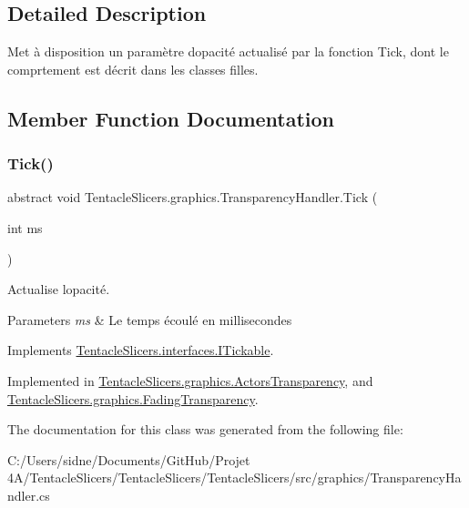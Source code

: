 \subsection{Detailed Description}
Met à disposition un paramètre d\textquotesingle{}opacité actualisé par la fonction Tick, dont le comprtement est décrit dans les classes filles. 



\subsection{Member Function Documentation}
\mbox{\label{class_tentacle_slicers_1_1graphics_1_1_transparency_handler_ab0f18e90768c180b0f804e1531a7c210}} 
\subsubsection{\texorpdfstring{Tick()}{Tick()}}
{\footnotesize\ttfamily abstract void Tentacle\+Slicers.\+graphics.\+Transparency\+Handler.\+Tick (\begin{DoxyParamCaption}\item[{int}]{ms }\end{DoxyParamCaption})\hspace{0.3cm}{\ttfamily [pure virtual]}}



Actualise l\textquotesingle{}opacité. 


\begin{DoxyParams}{Parameters}
{\em ms} & Le temps écoulé en millisecondes \\
\hline
\end{DoxyParams}


Implements \hyperlink{interface_tentacle_slicers_1_1interfaces_1_1_i_tickable}{Tentacle\+Slicers.\+interfaces.\+I\+Tickable}.



Implemented in \hyperlink{class_tentacle_slicers_1_1graphics_1_1_actors_transparency_ab8b40757e45cc24f5ac97a356cc9701b}{Tentacle\+Slicers.\+graphics.\+Actors\+Transparency}, and \hyperlink{class_tentacle_slicers_1_1graphics_1_1_fading_transparency_a0558563624c4749be727bfd0aefb293e}{Tentacle\+Slicers.\+graphics.\+Fading\+Transparency}.



The documentation for this class was generated from the following file\+:\begin{DoxyCompactItemize}
\item 
C\+:/\+Users/sidne/\+Documents/\+Git\+Hub/\+Projet 4\+A/\+Tentacle\+Slicers/\+Tentacle\+Slicers/\+Tentacle\+Slicers/src/graphics/Transparency\+Handler.\+cs\end{DoxyCompactItemize}

